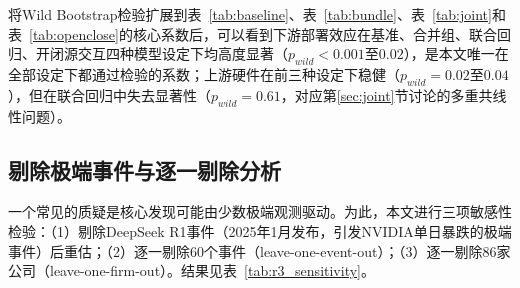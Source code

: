 \documentclass[11pt,fontset=fandol,a4paper]{ctexart}
\begin{document}
将Wild Bootstrap检验扩展到表~\ref{tab:baseline}、表~\ref{tab:bundle}、表~\ref{tab:joint}和表~\ref{tab:openclose}的核心系数后，可以看到下游部署效应在基准、合并组、联合回归、开闭源交互四种模型设定下均高度显著（$p_{wild}<0.001$至$0.02$），是本文唯一在全部设定下都通过检验的系数；上游硬件在前三种设定下稳健（$p_{wild}=0.02$至$0.04$），但在联合回归中失去显著性（$p_{wild}=0.61$，对应第\ref{sec:joint}节讨论的多重共线性问题）。

\subsection{剔除极端事件与逐一剔除分析}

一个常见的质疑是核心发现可能由少数极端观测驱动。为此，本文进行三项敏感性检验：（1）剔除DeepSeek R1事件（2025年1月发布，引发NVIDIA单日暴跌的极端事件）后重估；（2）逐一剔除60个事件（leave-one-event-out）；（3）逐一剔除86家公司（leave-one-firm-out）。结果见表~\ref{tab:r3_sensitivity}。
\end{document}
